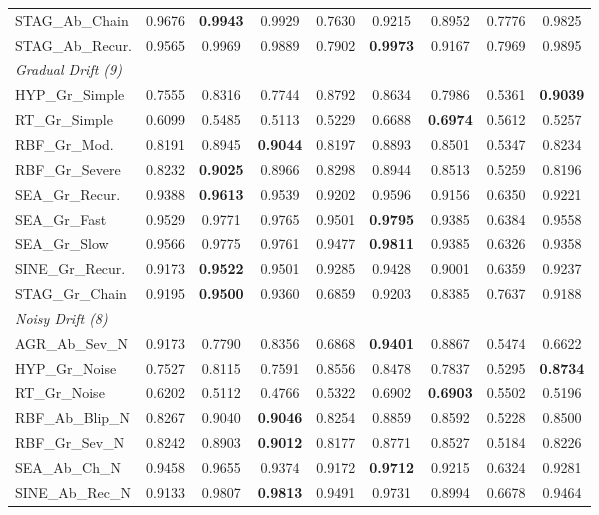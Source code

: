 \documentclass[lettersize,10pt]{article}
\begin{document}
\begin{longtable}{lcccccccc}
STAG\_Ab\_Chain & 0.9676 & \textbf{0.9943} & 0.9929 & 0.7630 & 0.9215 & 0.8952 & 0.7776 & 0.9825 \\
STAG\_Ab\_Recur. & 0.9565 & 0.9969 & 0.9889 & 0.7902 & \textbf{0.9973} & 0.9167 & 0.7969 & 0.9895 \\
\midrule \multicolumn{9}{l}{\textit{Gradual Drift (9)}}\\
\midrule
HYP\_Gr\_Simple & 0.7555 & 0.8316 & 0.7744 & 0.8792 & 0.8634 & 0.7986 & 0.5361 & \textbf{0.9039} \\
RT\_Gr\_Simple & 0.6099 & 0.5485 & 0.5113 & 0.5229 & 0.6688 & \textbf{0.6974} & 0.5612 & 0.5257 \\
RBF\_Gr\_Mod. & 0.8191 & 0.8945 & \textbf{0.9044} & 0.8197 & 0.8893 & 0.8501 & 0.5347 & 0.8234 \\
RBF\_Gr\_Severe & 0.8232 & \textbf{0.9025} & 0.8966 & 0.8298 & 0.8944 & 0.8513 & 0.5259 & 0.8196 \\
SEA\_Gr\_Recur. & 0.9388 & \textbf{0.9613} & 0.9539 & 0.9202 & 0.9596 & 0.9156 & 0.6350 & 0.9221 \\
SEA\_Gr\_Fast & 0.9529 & 0.9771 & 0.9765 & 0.9501 & \textbf{0.9795} & 0.9385 & 0.6384 & 0.9558 \\
SEA\_Gr\_Slow & 0.9566 & 0.9775 & 0.9761 & 0.9477 & \textbf{0.9811} & 0.9385 & 0.6326 & 0.9358 \\
SINE\_Gr\_Recur. & 0.9173 & \textbf{0.9522} & 0.9501 & 0.9285 & 0.9428 & 0.9001 & 0.6359 & 0.9237 \\
STAG\_Gr\_Chain & 0.9195 & \textbf{0.9500} & 0.9360 & 0.6859 & 0.9203 & 0.8385 & 0.7637 & 0.9188 \\
\midrule \multicolumn{9}{l}{\textit{Noisy Drift (8)}}\\
\midrule
AGR\_Ab\_Sev\_N & 0.9173 & 0.7790 & 0.8356 & 0.6868 & \textbf{0.9401} & 0.8867 & 0.5474 & 0.6622 \\
HYP\_Gr\_Noise & 0.7527 & 0.8115 & 0.7591 & 0.8556 & 0.8478 & 0.7837 & 0.5295 & \textbf{0.8734} \\
RT\_Gr\_Noise & 0.6202 & 0.5112 & 0.4766 & 0.5322 & 0.6902 & \textbf{0.6903} & 0.5502 & 0.5196 \\
RBF\_Ab\_Blip\_N & 0.8267 & 0.9040 & \textbf{0.9046} & 0.8254 & 0.8859 & 0.8592 & 0.5228 & 0.8500 \\
RBF\_Gr\_Sev\_N & 0.8242 & 0.8903 & \textbf{0.9012} & 0.8177 & 0.8771 & 0.8527 & 0.5184 & 0.8226 \\
SEA\_Ab\_Ch\_N & 0.9458 & 0.9655 & 0.9374 & 0.9172 & \textbf{0.9712} & 0.9215 & 0.6324 & 0.9281 \\
SINE\_Ab\_Rec\_N & 0.9133 & 0.9807 & \textbf{0.9813} & 0.9491 & 0.9731 & 0.8994 & 0.6678 & 0.9464 \\

\end{longtable}
\end{document}
